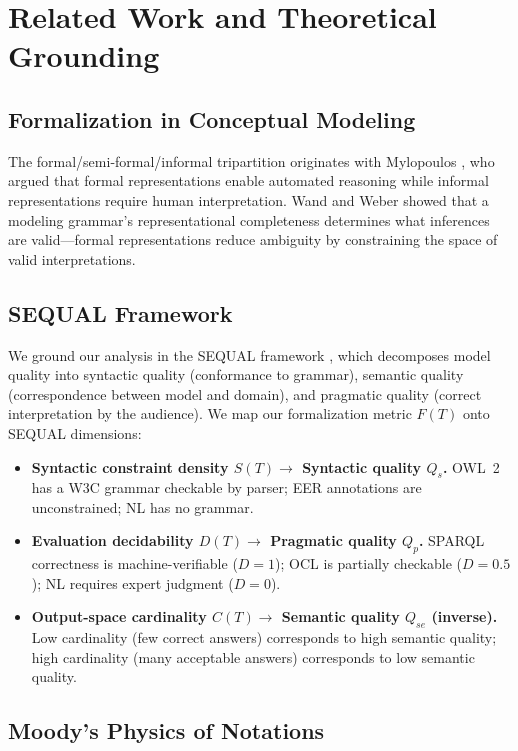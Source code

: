 \documentclass[runningheads]{llncs}
\begin{document}
\section{Related Work and Theoretical Grounding}
\label{sec:related}

\subsection{Formalization in Conceptual Modeling}

The formal/semi-formal/informal tripartition originates with Mylopoulos \cite{mylopoulos1992conceptual}, who argued that formal representations enable automated reasoning while informal representations require human interpretation. Wand and Weber \cite{wand1990ontological} showed that a modeling grammar's representational completeness determines what inferences are valid---formal representations reduce ambiguity by constraining the space of valid interpretations.

\subsection{SEQUAL Framework}

We ground our analysis in the SEQUAL framework \cite{krogstie1995quality,krogstie2016quality}, which decomposes model quality into syntactic quality (conformance to grammar), semantic quality (correspondence between model and domain), and pragmatic quality (correct interpretation by the audience). We map our formalization metric $F(T)$ onto SEQUAL dimensions:

\begin{itemize}[noitemsep]
  \item \textbf{Syntactic constraint density $S(T) \rightarrow$ Syntactic quality $Q_s$.} OWL~2 has a W3C grammar checkable by parser; EER annotations are unconstrained; NL has no grammar.
  \item \textbf{Evaluation decidability $D(T) \rightarrow$ Pragmatic quality $Q_p$.} SPARQL correctness is machine-verifiable ($D=1$); OCL is partially checkable ($D=0.5$); NL requires expert judgment ($D=0$).
  \item \textbf{Output-space cardinality $C(T) \rightarrow$ Semantic quality $Q_{se}$ (inverse).} Low cardinality (few correct answers) corresponds to high semantic quality; high cardinality (many acceptable answers) corresponds to low semantic quality.
\end{itemize}

\subsection{Moody's Physics of Notations}
\end{document}
